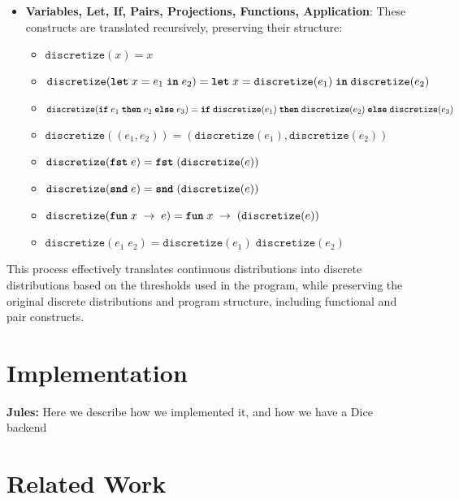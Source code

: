 \documentclass[nonacm,anonymous]{acmart}
\newcommand{\jules}[1]{{\color{blue}\textbf{Jules:} #1}}
\newcommand{\letkw}{\text{\ttfamily\bfseries let}}
\newcommand{\inkw}{\text{\ttfamily\bfseries in}}
\newcommand{\ifkw}{\text{\ttfamily\bfseries if}}
\newcommand{\thenkw}{\text{\ttfamily\bfseries then}}
\newcommand{\elsekw}{\text{\ttfamily\bfseries else}}
\newcommand{\fstkw}{\text{\ttfamily\bfseries fst}}
\newcommand{\sndkw}{\text{\ttfamily\bfseries snd}}
\newcommand{\funkw}{\text{\ttfamily\bfseries fun}}
\begin{document}
\begin{itemize}
    \item \textbf{Variables, Let, If, Pairs, Projections, Functions, Application}: These constructs are translated recursively, preserving their structure:
    \begin{itemize}
        \item $\texttt{discretize}(x) = x$
        \item $\texttt{discretize}(\letkw \; x = e_1 \; \inkw \; e_2) = \letkw \; x = \texttt{discretize}(e_1) \; \inkw \; \texttt{discretize}(e_2)$
        \item $\texttt{discretize}(\ifkw \; e_1 \; \thenkw \; e_2 \; \elsekw \; e_3) = \ifkw \; \texttt{discretize}(e_1) \; \thenkw \; \texttt{discretize}(e_2) \; \elsekw \; \texttt{discretize}(e_3)$
        \item $\texttt{discretize}((e_1, e_2)) = (\texttt{discretize}(e_1), \texttt{discretize}(e_2))$
        \item $\texttt{discretize}(\fstkw \; e) = \fstkw \; (\texttt{discretize}(e))$
        \item $\texttt{discretize}(\sndkw \; e) = \sndkw \; (\texttt{discretize}(e))$
        \item $\texttt{discretize}(\funkw \; x \; \rightarrow \; e) = \funkw \; x \; \rightarrow \; (\texttt{discretize}(e))$
        \item $\texttt{discretize}(e_1 \; e_2) = \texttt{discretize}(e_1) \; \texttt{discretize}(e_2)$
    \end{itemize}
\end{itemize}

This process effectively translates continuous distributions into discrete distributions based on the thresholds used in the program, while preserving the original discrete distributions and program structure, including functional and pair constructs.

\section{Implementation}

\jules{Here we describe how we implemented it, and how we have a Dice backend}

\section{Related Work}
\label{sec:related}
\end{document}
